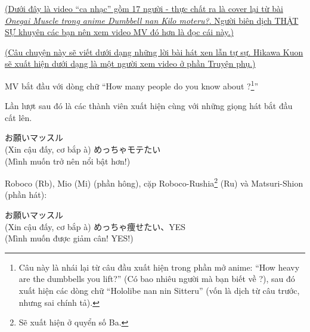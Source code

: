 \documentclass[../main.tex]{subfiles}
\begin{document}
\color{black}

\vspace{30pt}


\begin{center}
  \uline{(Dưới đây là video ``ca nhạc'' gồm 17 người - thực chất ra là cover lại từ bài \textit{Onegai Muscle trong anime Dumbbell nan Kilo moteru?}. Người biên dịch THẬT SỰ khuyên các bạn nên xem video MV đó hơn là đọc cái này.)}


  \uline{(Câu chuyện này sẽ viết dưới dạng những lời bài hát xen lẫn tự sự. Hikawa Kuon sẽ xuất hiện dưới dạng là một người xem video ở phần {\abv Truyện phụ}.)}
\end{center}

\il

MV bắt đầu với dòng chữ ``How many people do you know about \hll?\footnote{Câu này là nhái lại từ câu đầu xuất hiện trong phần mở anime: ``How heavy are the dumbbells you lift?'' (Có bao nhiêu người mà bạn biết về \hll?), sau đó xuất hiện các dòng chữ ``Hololibe nan nin Sitteru'' (vốn là dịch từ câu trước, nhưng sai chính tả).}''

Lần lượt sau đó là các thành viên xuất hiện cùng với những giọng hát bắt đầu cất lên.

\begin{dialogue}
   お願いマッスル\\(Xin cậu đấy, cơ bắp à)
   めっちゃモテたい\\(Mình muốn trở nên nổi bật hơn!)
\end{dialogue}

Roboco (Rb), Mio (Mi) (phần hông), cặp Roboco-Rushia\footnote{Sẽ xuất hiện ở quyển số Ba.} (Ru) và Matsuri-Shion (phần hát):

\begin{dialogue}
   お願いマッスル\\(Xin cậu đấy, cơ bắp à)
   めっちゃ痩せたい、YES\\(Mình muốn được giảm cân! YES!)
\end{dialogue}
\end{document}
